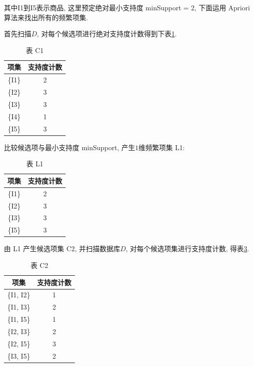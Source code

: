 \documentclass[a4paper,UTF8]{ctexart}
\theoremstyle{plain} \newtheorem{theorem}{定理}[section]
\theoremstyle{plain} \newtheorem{definition}{定义}[section]
\theoremstyle{plain} \newtheorem{lemma}{引理}[section]
\theoremstyle{plain} \newtheorem{proposition}{命题}[section]
\theoremstyle{plain} \newtheorem{example}{例}[section]
\theoremstyle{plain} \newtheorem{remark}{注}[section]
\theoremstyle{plain} \newtheorem{corollary}{推论}[section]
\begin{document}
其中I1到I5表示商品, 这里预定绝对最小支持度 minSupport = 2, 下面运用 Apriori 算法来找出所有的频繁项集.

首先扫描$D$, 对每个候选项进行绝对支持度计数得到下表\ref{c1}.
\begin{table}[!htb]
\centering
\caption{表 	C1}
\label{c1}
\begin{tabular}{c|c}
	\hline
    \textbf{项集} & \textbf{支持度计数}  \\
    \hline
    \{I1\}   &  2  \\
    \hline
    \{I2\}   &  3  \\
    \hline
    \{I3\}   &  3 \\
    \hline
    \{I4\}   &  1  \\
    \hline
    \{I5\}   &  3  \\
	\hline
\end{tabular}
\end{table}

比较候选项与最小支持度 minSupport, 产生$1$维频繁项集 L1:
\begin{table}[!htb]
\centering
\caption{表 L1}
\label{l1}
\begin{tabular}{c|c}
	\hline
    \textbf{项集} & \textbf{支持度计数}  \\
    \hline
    \{I1\}   &  2 \\
    \hline
    \{I2\}   &  3 \\
    \hline
    \{I3\}   &  3 \\
    \hline
    \{I5\}   &  3 \\
	\hline
\end{tabular}
\end{table}

由 L1 产生候选项集 C2, 并扫描数据库$D$, 对每个候选项集进行支持度计数, 得表\ref{c2}.
\begin{table}[!htb]
\centering
\caption{表 C2}
\label{c2}
\begin{tabular}{c|c}
	\hline
    \textbf{项集} & \textbf{支持度计数}  \\
    \hline
    \{I1, I2\}   &   1  \\
    \hline
    \{I1, I3\}   &   2  \\
    \hline
    \{I1, I5\}   &   1  \\
    \hline
    \{I2, I3\}   &   2  \\
    \hline
    \{I2, I5\}   &   3  \\
    \hline
    \{I3, I5\}   &   2  \\
	\hline
\end{tabular}
\end{table}
\end{document}
